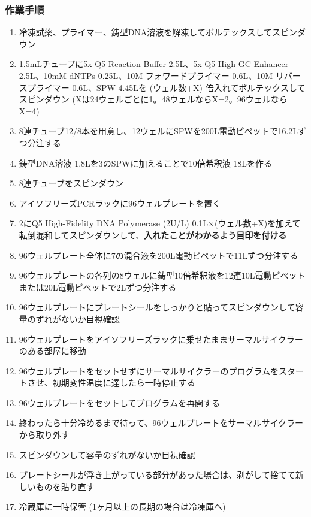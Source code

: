 \documentclass[titlepage,10pt,a4paper,uplatex]{jsbook}
\renewcommand{\textbf}[1]{{\bfseries\sffamily#1}}
\begin{document}
\subsubsection{作業手順}
\begin{enumerate}
\item 冷凍試薬、プライマー、鋳型DNA溶液を解凍してボルテックスしてスピンダウン
\item 1.5mLチューブに5x Q5 Reaction Buffer 2.5{\textmu}L、5x Q5 High GC Enhancer 2.5{\textmu}L、10mM dNTPs 0.25{\textmu}L、10{\textmu}M フォワードプライマー 0.6{\textmu}L、10{\textmu}M リバースプライマー 0.6{\textmu}L、SPW 4.45{\textmu}Lを (ウェル数+X) 倍入れてボルテックスしてスピンダウン (Xは24ウェルごとに1。48ウェルならX=2。96ウェルならX=4)
\item 8連チューブ12/8本を用意し、12ウェルにSPWを200{\textmu}L電動ピペットで16.2{\textmu}Lずつ分注する
\item 鋳型DNA溶液 1.8{\textmu}Lを3のSPWに加えることで10倍希釈液 18{\textmu}Lを作る
\item 8連チューブをスピンダウン
\item アイソフリーズPCRラックに96ウェルプレートを置く
\item 2にQ5 High-Fidelity DNA Polymerase (2U/{\textmu}L) 0.1{\textmu}L×(ウェル数+X)を加えて転倒混和してスピンダウンして、\textbf{入れたことがわかるよう目印を付ける}
\item 96ウェルプレート全体に7の混合液を200{\textmu}L電動ピペットで11{\textmu}Lずつ分注する
\item 96ウェルプレートの各列の8ウェルに鋳型10倍希釈液を12連10{\textmu}L電動ピペットまたは20{\textmu}L電動ピペットで2{\textmu}Lずつ分注する
\item 96ウェルプレートにプレートシールをしっかりと貼ってスピンダウンして容量のずれがないか目視確認
\item 96ウェルプレートをアイソフリーズラックに乗せたままサーマルサイクラーのある部屋に移動
\item 96ウェルプレートをセットせずにサーマルサイクラーのプログラムをスタートさせ、初期変性温度に達したら一時停止する
\item 96ウェルプレートをセットしてプログラムを再開する
\item 終わったら十分冷めるまで待って、96ウェルプレートをサーマルサイクラーから取り外す
\item スピンダウンして容量のずれがないか目視確認
\item プレートシールが浮き上がっている部分があった場合は、剥がして捨てて新しいものを貼り直す
\item 冷蔵庫に一時保管 (1ヶ月以上の長期の場合は冷凍庫へ)
\end{enumerate}
\end{document}
